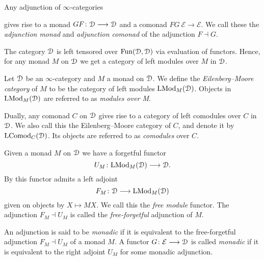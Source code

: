 \begin{example}
    Any adjunction of $\infty$-categories
    \begin{center}
    \end{center}
    gives rise to a monad $GF\colon \EuScript{D}\longrightarrow \EuScript{D}$ and a comonad $FG\:\mathcal{E}\to \mathcal{E}$. We call these the \emph{adjunction monad} and \emph{adjunction comonad} of the adjunction $F\dashv G$. 
\end{example}

The category $\EuScript{D}$ is left tensored over $\operatorname{Fun}(\EuScript{D}, \EuScript{D})$ via evaluation of functors. Hence, for any monad $M$ on $\EuScript{D}$ we get a category of left modules over $M$ in $\EuScript{D}$. 

\begin{definition}
    Let $\EuScript{D}$ be an $\infty$-category and $M$ a monad on $\EuScript{D}$. We define the \emph{Eilenberg--Moore category} of $M$ to be the category of left modules $\mathrm{LMod}_M(\EuScript{D})$. Objects in $\mathrm{LMod}_M(\EuScript{D})$ are referred to as \emph{modules over M}. 
\end{definition}

\begin{remark}
    Dually, any comonad $C$ on $\EuScript{D}$ gives rise to a category of left comodules over $C$ in $\EuScript{D}$. We also call this the Eilenberg--Moore category of $C$, and denote it by $\mathrm{LComod}_C(\EuScript{D})$. Its objects are referred to as \emph{comodules} over $C$. 
\end{remark}

Given a monad $M$ on $\EuScript{D}$ we have a forgetful functor 
\[U_M\colon \mathrm{LMod}_M(\EuScript{D})\longrightarrow \EuScript{D}.\] 
By \cite[4.2.4.8]{Lurie_HA} this functor admits a left adjoint 
\[F_M\colon \EuScript{D}\longrightarrow \mathrm{LMod}_M(\EuScript{D})\] 
given on objects by $X\longmapsto MX$. We call this the \emph{free module} functor. The adjunction $F_M\dashv U_M$ is called the \emph{free-forgetful} adjunction of $M$. 

\begin{definition}
    An adjunction is said to be \emph{monadic} if it is equivalent to the free-forgetful adjunction $F_M\dashv U_M$ of a monad $M$. A functor $G\colon \mathcal{E}\longrightarrow \EuScript{D}$ is called \emph{monadic} if it is equivalent to the right adjoint $U_M$ for some monadic adjunction. 
\end{definition}

